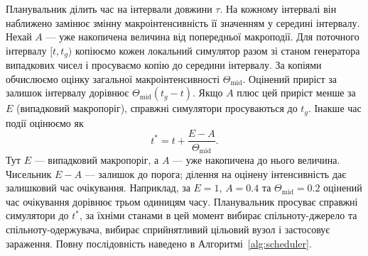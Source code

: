 \documentclass[a4paper,fleqn]{cas-sc}
\begin{document}
Планувальник ділить час на інтервали довжини $\tau$.
На кожному інтервалі він наближено замінює змінну
макроінтенсивність її значенням у середині інтервалу. Нехай $A$ --- уже накопичена величина від попередньої макроподії. Для поточного інтервалу $[t,t_g)$ копіюємо кожен локальний симулятор разом зі станом генератора випадкових чисел і просуваємо копію до середини інтервалу. За копіями обчислюємо оцінку загальної макроінтенсивності $\Theta_{\mathrm{mid}}$. Оцінений приріст за залишок інтервалу дорівнює $\Theta_{\mathrm{mid}}(t_g-t)$. Якщо $A$ плюс цей приріст менше за $E$ (випадковий макропоріг), справжні симулятори просуваються до $t_g$. Інакше час події оцінюємо як
\begin{equation}
\label{eq:interpolation}
t^\ast=t+\frac{E-A}{\Theta_{\mathrm{mid}}}.
\end{equation}
Тут $E$ --- випадковий макропоріг, а $A$ --- уже накопичена до нього величина. Чисельник $E-A$ --- залишок до порога; ділення на оцінену інтенсивність дає залишковий час очікування. Наприклад, за $E=1$, $A=0.4$ та $\Theta_{\mathrm{mid}}=0.2$ оцінений час очікування дорівнює трьом одиницям часу. Планувальник просуває справжні симулятори до $t^\ast$, за їхніми станами в цей момент вибирає спільноту-джерело та спільноту-одержувача, вибирає сприйнятливий цільовий вузол і застосовує зараження. Повну послідовність наведено в Алгоритмі~\ref{alg:scheduler}.
\end{document}
